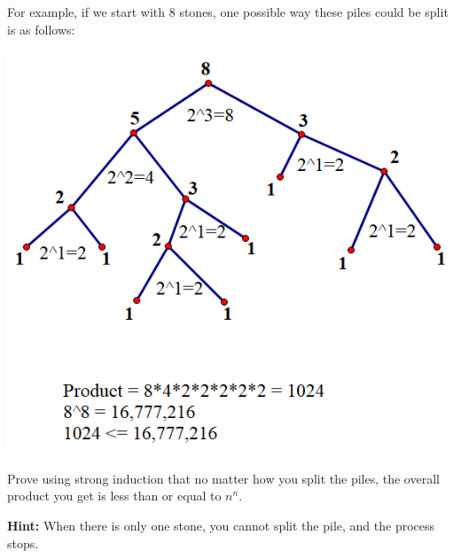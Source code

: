 \documentclass[12pt]{exam}
\begin{document}
For example, if we start with 8 stones, one possible way these piles could be split is as follows:

\begin{center}\includegraphics[scale=.75]{induction.png}\end{center}

Prove using strong induction that no matter how you split the piles, the overall product you get is less than or equal to $n^ n$.

\textbf{Hint:} When there is only one stone, you cannot split the pile, and the process stops.

\begin{solution}

\end{solution}
\end{document}
